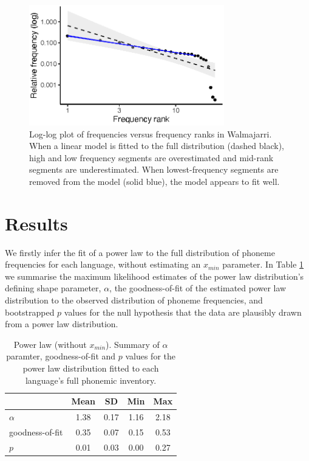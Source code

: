 \begin{figure}

{\centering \includegraphics[width=85mm]{03-phoneme-frequencies/fig/Fig2_walmajarri_lm} 

}

\caption{Log-log plot of frequencies versus frequency ranks in Walmajarri. When a linear model is fitted to the full distribution (dashed black), high and low frequency segments are overestimated and mid-rank segments are underestimated. When lowest-frequency segments are removed from the model (solid blue), the model appears to fit well.}\label{fig:Figure-2}
\end{figure}

\hypertarget{phon-freq-results}{%
\section{Results}\label{phon-freq-results}}

We firstly infer the fit of a power law to the full distribution of phoneme frequencies for each language, without estimating an \(x_{min}\) parameter. In Table \ref{tab:pl-summary} we summarise the maximum likelihood estimates of the power law distribution's defining shape parameter, \(\alpha\), the goodness-of-fit of the estimated power law distribution to the observed distribution of phoneme frequencies, and bootstrapped \(p\) values for the null hypothesis that the data are plausibly drawn from a power law distribution.

\begin{table}

\caption{\label{tab:pl-summary}Power law (without $x_{min}$). Summary of $\alpha$ paramter, goodness-of-fit and $p$ values for the power law distribution fitted to each language's full phonemic inventory.}
\centering
\begin{tabular}[t]{lcccc}
\toprule
\textbf{ } & \textbf{Mean} & \textbf{SD} & \textbf{Min} & \textbf{Max}\\
\midrule
$\alpha$ & 1.38 & 0.17 & 1.16 & 2.18\\
goodness-of-fit & 0.35 & 0.07 & 0.15 & 0.53\\
$p$ & 0.01 & 0.03 & 0.00 & 0.27\\
\bottomrule
\end{tabular}
\end{table}

